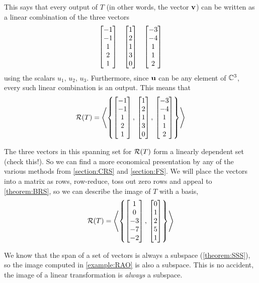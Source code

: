 \documentclass{ximera}
\begin{document}
\begin{example}
This says that every output of $T$ (in other words, the vector $\mathbf{v}$) can be written as a linear combination of the three vectors
\begin{align*}
\begin{bmatrix}-1\\-1\\1\\2\\1\end{bmatrix}
&&
\begin{bmatrix}1\\2\\1\\3\\ 0\end{bmatrix}
&&
\begin{bmatrix}-3\\-4\\1\\1\\2\end{bmatrix}
\end{align*}
using the scalars $u_1,\,u_2,\,u_3$.  Furthermore, since $\mathbf{u}$ can be any element of $\mathbb{C}^{3}$, every such linear combination is an output.  This means that
\[
\mathcal{R}\!\left(T\right)=\left\langle\left\{
\begin{bmatrix}-1\\-1\\1\\2\\1\end{bmatrix},\,
\begin{bmatrix}1\\2\\1\\3\\ 0\end{bmatrix},\,
\begin{bmatrix}-3\\-4\\1\\1\\2\end{bmatrix}
\right\}\right\rangle
\]




The three vectors in this spanning set for $\mathcal{R}\!\left(T\right)$ form a linearly dependent set (check this!).  So we can find a more economical presentation by any of the various methods from \ref{section:CRS} and \ref{section:FS}.  We will place the vectors into a matrix as rows, row-reduce, toss out zero rows and appeal to \ref{theorem:BRS}, so we can describe the image of $T$ with a basis,
\[
\mathcal{R}\!\left(T\right)=\left\langle\left\{
\begin{bmatrix}1\\0\\-3\\-7\\-2\end{bmatrix},\,\begin{bmatrix}0\\1\\2\\5\\1\end{bmatrix}
\right\}\right\rangle
\]

\end{example}

We know that the span of a set of vectors is always a subspace (\ref{theorem:SSS}), so the image computed in \ref{example:RAO} is also a subspace.  This is no accident, the image of a linear transformation is \textit{always} a subspace.
\end{document}
